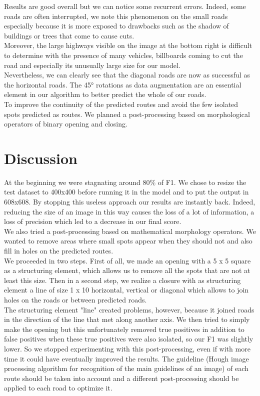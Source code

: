 \documentclass[10pt,conference,compsocconf]{IEEEtran}
\begin{document}
Results are good overall but we can notice some recurrent errors. Indeed, some roads are often interrupted, we note this phenomenon on the small roads especially because it is more exposed to drawbacks such as the shadow of buildings or trees that come to cause cuts. \\
Moreover, the large highways visible on the image at the bottom right is difficult to determine with the presence of many vehicles, billboards coming to cut the road and especially its unusually large size for our model. \\
Nevertheless, we can clearly see that the diagonal roads are now as successful as the horizontal roads. The 45° rotations as data augmentation are an essential element in our algorithm to better predict the whole of our roads. \\
To improve the continuity of the predicted routes and avoid the few isolated spots predicted as routes. We planned a post-processing based on morphological operators of binary opening and closing.

\section{Discussion}
At the beginning we were stagnating around 80\% of F1. We chose to resize the test dataset to 400x400 before running it in the model and to put the output in 608x608. By stopping this useless approach our results are instantly back. Indeed, reducing the size of an image in this way causes the loss of a lot of information, a loss of precision which led to a decrease in our final score. \\
We also tried a post-processing based on mathematical morphology operators. We wanted to remove areas where small spots appear when they should not and also fill in holes on the predicted routes. \\
We proceeded in two steps. First of all, we made an opening with a 5 x 5 square as a structuring element, which allows us to remove all the spots that are not at least this size. Then in a second step, we realize a closure with as structuring element a line of size 1 x 10 horizontal, vertical or diagonal which allows to join holes on the roads or between predicted roads. \\
The structuring element "line" created problems, however, because it joined roads in the direction of the line that met along another axis. We then tried to simply make the opening but this unfortunately removed true positives in addition to false positives when these true positives were also isolated, so our F1 was slightly lower. So we stopped experimenting with this post-processing, even if with more time it could have eventually improved the results. The guideline (Hough image processing algorithm for recognition of the main guidelines of an image) of each route should be taken into account and a different post-processing should be applied to each road to optimize it.



\end{document}

